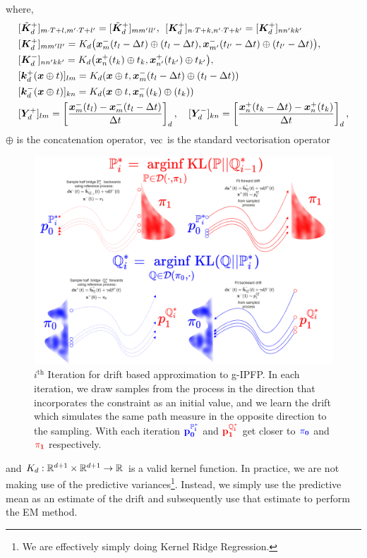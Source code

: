 \documentclass[a4paper,12pt,twoside,openright]{report}
\theoremstyle{definition}
\begin{document}
where,
\begin{align*}
   & [ \tilde{\mK}_d^{+} ]_{m\cdot T+l,m'\cdot T+l'} = [ \tilde{\mK}_d^{+} ]_{mm'll'}, \:\:  [ \mK_d^{+} ]_{n\cdot T+k,n' \cdot T +k'} = [ \mK_d^{+} ]_{nn'kk'}\\
   &[ \mK_d^{+} ]_{mm'll'} = {K}_d\big(\vx^{-}_m(t_l- \Delta t)\oplus (t_l - \Delta t), \vx^{-}_{m'}(t_{l'} - \Delta t)\oplus ( t_{l'} - \Delta t) \big), \\
   &[ \mK_d^{-} ]_{nn'kk'} = {K}_d\big(\vx^{+}_n(t_k) \oplus t_k , \vx^{+}_{n'}(t_{k'})\oplus t_{k'} \big),  \\
   &[\vk_d^{+}(\vx \oplus t)]_{lm} = K_d(\vx \oplus t , \vx^{-}_m(t_l- \Delta t)\oplus (t_l - \Delta t))\\
   &[\vk_d^{-}(\vx \oplus t)]_{kn} = K_d(\vx \oplus t , \vx^{-}_n(t_k)\oplus (t_k))\\
   &[\mY_d^{+}]_{lm} =  \left[\frac{\vx^{-}_m(t_l) - \vx^{-}_m(t_l - \Delta t)}{\Delta t}\right]_d, \quad [\mY_d^{-}]_{kn} =  \left[\frac{\vx^{+}_n(t_k - \Delta t)  - \vx^{+}_n(t_k)}{\Delta t} \right]_d,
\end{align*}
 $\oplus$ is the concatenation operator, $\vec$ is the standard vectorisation operator 
\begin{landscape}
\begin{figure}
    \vspace{-2cm}
    \includegraphics[scale=0.7]{images/gp_IPFP.PNG}
    \caption{$i^{\text{th}}$ Iteration for drift based approximation to g-IPFP. In each iteration, we draw samples from the process in the direction that incorporates the constraint as an initial value, and we learn the drift which simulates the same path measure in the opposite direction to the sampling. With each iteration $\mathbf{\color{blue}{p^{\P^{*}_i}_0}}$ and $\mathbf{\color{red}{p^{\Q^{*}_i}_1}}$ get closer to $\mathbf{\color{blue}{\pi_0}}$ and $\mathbf{\color{red}{\pi_1}}$ respectively.}
    \label{fig:gp_drift}
\end{figure}
\end{landscape}
and $K_d: \R^{d+1} \times \R^{d+1} \rightarrow \R$ is a valid kernel function. In practice, we are not making use of the predictive variances\footnote{We are effectively simply doing Kernel Ridge Regression.}. Instead, we simply use the predictive mean as an estimate of the drift and subsequently use that estimate to perform the EM method.
\end{document}
